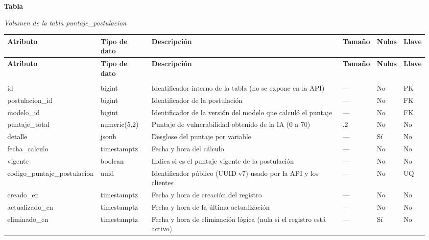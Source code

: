 \label{tab:volumen_puntaje_postulacion}
\noindent\textbf{Tabla~\thetable}\par\nopagebreak
\noindent\textit{Volumen de la tabla puntaje\_\allowbreak{}postulacion}\par\nopagebreak
\begingroup\small\linespread{1}\selectfont\setlength{\tabcolsep}{4pt}
\begin{longtable}{>{\raggedright\arraybackslash}p{3.4cm} >{\raggedright\arraybackslash}p{2.5cm} >{\raggedright\arraybackslash}p{4.8cm} >{\centering\arraybackslash}p{1.6cm}>{\centering\arraybackslash}p{1.1cm} >{\centering\arraybackslash}p{1.3cm}}
\toprule
\textbf{Atributo} & \textbf{Tipo de dato} & \textbf{Descripción} & \textbf{Tamaño} & \textbf{Nulos} & \textbf{Llave} \\
\midrule
\endfirsthead
\toprule
\textbf{Atributo} & \textbf{Tipo de dato} & \textbf{Descripción} & \textbf{Tamaño} & \textbf{Nulos} & \textbf{Llave} \\
\midrule
\endhead
\endfoot
\bottomrule
\multicolumn{6}{l}{\textit{Nota.} Elaboración propia.} \\
\endlastfoot
id & bigint & Identificador interno de la tabla (no se expone en la API) & — & No & PK \\
postulacion\_\allowbreak{}id & bigint & Identificador de la postulación & — & No & FK \\
modelo\_\allowbreak{}id & bigint & Identificador de la versión del modelo que calculó el puntaje & — & No & FK \\
puntaje\_\allowbreak{}total & numeric(5,2) & Puntaje de vulnerabilidad obtenido de la IA (0 a 70) & 5,2 & No & No \\
detalle & jsonb & Desglose del puntaje por variable & — & Sí & No \\
fecha\_\allowbreak{}calculo & timestamptz & Fecha y hora del cálculo & — & No & No \\
vigente & boolean & Indica si es el puntaje vigente de la postulación & — & No & No \\
codigo\_\allowbreak{}puntaje\_\allowbreak{}postulacion & uuid & Identificador público (UUID v7) usado por la API y los clientes & — & No & UQ \\
creado\_\allowbreak{}en & timestamptz & Fecha y hora de creación del registro & — & No & No \\
actualizado\_\allowbreak{}en & timestamptz & Fecha y hora de la última actualización & — & No & No \\
eliminado\_\allowbreak{}en & timestamptz & Fecha y hora de eliminación lógica (nula si el registro está activo) & — & Sí & No \\
\end{longtable}
\endgroup
\addtocounter{table}{-1}

